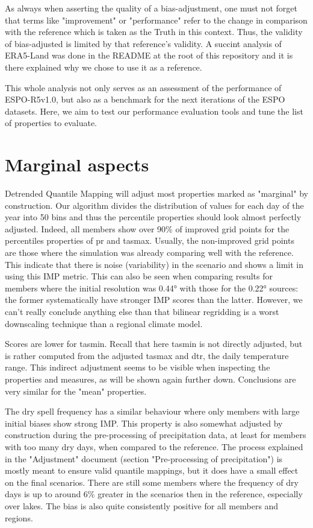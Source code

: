 \documentclass[letterpaper,10pt]{article}
\begin{document}
As always when asserting the quality of a bias-adjustment, one must not forget that terms like "improvement" or "performance" refer to the change in comparison with the reference which is taken as the Truth in this context. Thus, the validity of bias-adjusted is limited by that reference's validity. A succint analysis of ERA5-Land was done in the README at the root of this repository and it is there explained why we chose to use it as a reference.

This whole analysis not only serves as an assessment of the performance of ESPO-R5v1.0, but also as a benchmark for the next iterations of the ESPO datasets. Here, we aim to test our performance evaluation tools and tune the list of properties to evaluate.

\section{Marginal aspects}\label{sec:marg}
Detrended Quantile Mapping will adjust most properties marked as "marginal" by construction. Our algorithm divides the distribution of values for each day of the year into 50 bins and thus the percentile properties should look almost perfectly adjusted. Indeed, all members show over 90\% of improved grid points for the percentiles properties of pr and tasmax. Usually, the non-improved grid points are those where the simulation was already comparing well with the reference. This indicate that there is noise (variability) in the scenario and shows a limit in using this IMP metric. This can also be seen when comparing results for members where the initial resolution was 0.44° with those for the 0.22° sources: the former systematically have stronger IMP scores than the latter. However, we can't really conclude anything else than that bilinear regridding is a worst downscaling technique than a regional climate model.

Scores are lower for tasmin. Recall that here tasmin is not directly adjusted, but is rather computed from the adjusted tasmax and dtr, the daily temperature range. This indirect adjustment seems to be visible when inspecting the properties and measures, as will be shown again further down. Conclusions are very similar for the "mean" properties.

The dry spell frequency has a similar behaviour where only members with large initial biases show strong IMP. This property is also somewhat adjusted by construction during the pre-processing of precipitation data, at least for members with too many dry days, when compared to the reference. The process explained in the "Adjustment" document (section "Pre-processing of precipitation") is mostly meant to ensure valid quantile mappings, but it does have a small effect on the final scenarios. There are still some members where the frequency of dry days is up to around 6\% greater in the scenarios then in the reference, especially over lakes. The bias is also quite consistently positive for all members and regions.
\end{document}
